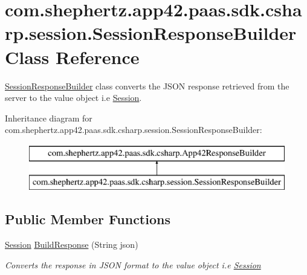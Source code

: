 \hypertarget{classcom_1_1shephertz_1_1app42_1_1paas_1_1sdk_1_1csharp_1_1session_1_1_session_response_builder}{\section{com.\+shephertz.\+app42.\+paas.\+sdk.\+csharp.\+session.\+Session\+Response\+Builder Class Reference}
\label{classcom_1_1shephertz_1_1app42_1_1paas_1_1sdk_1_1csharp_1_1session_1_1_session_response_builder}
}


\hyperlink{classcom_1_1shephertz_1_1app42_1_1paas_1_1sdk_1_1csharp_1_1session_1_1_session_response_builder}{Session\+Response\+Builder} class converts the J\+S\+O\+N response retrieved from the server to the value object i.\+e \hyperlink{classcom_1_1shephertz_1_1app42_1_1paas_1_1sdk_1_1csharp_1_1session_1_1_session}{Session}.  


Inheritance diagram for com.\+shephertz.\+app42.\+paas.\+sdk.\+csharp.\+session.\+Session\+Response\+Builder\+:\begin{figure}[H]
\begin{center}
\leavevmode
\includegraphics[height=2.000000cm]{classcom_1_1shephertz_1_1app42_1_1paas_1_1sdk_1_1csharp_1_1session_1_1_session_response_builder}
\end{center}
\end{figure}
\subsection*{Public Member Functions}
\begin{DoxyCompactItemize}
\item 
\hyperlink{classcom_1_1shephertz_1_1app42_1_1paas_1_1sdk_1_1csharp_1_1session_1_1_session}{Session} \hyperlink{classcom_1_1shephertz_1_1app42_1_1paas_1_1sdk_1_1csharp_1_1session_1_1_session_response_builder_a89a11f1fe5763a3c922c955b679c0bf1}{Build\+Response} (String json)
\begin{DoxyCompactList}\small\item\em Converts the response in J\+S\+O\+N format to the value object i.\+e \hyperlink{classcom_1_1shephertz_1_1app42_1_1paas_1_1sdk_1_1csharp_1_1session_1_1_session}{Session} \end{DoxyCompactList}\end{DoxyCompactItemize}
